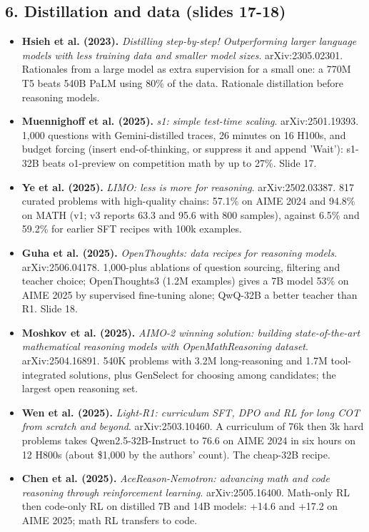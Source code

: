 \subsection*{6. Distillation and data (slides 17-18)}
\begin{itemize}[leftmargin=1.2em,itemsep=3pt]\sloppy
\item \textbf{Hsieh et al. (2023).} \textit{Distilling step-by-step! Outperforming larger language models with less training data and smaller model sizes}. arXiv:2305.02301. Rationales from a large model as extra supervision for a small one: a 770M T5 beats 540B PaLM using 80\% of the data. Rationale distillation before reasoning models.
\item \textbf{Muennighoff et al. (2025).} \textit{s1: simple test-time scaling}. arXiv:2501.19393. 1,000 questions with Gemini-distilled traces, 26 minutes on 16 H100s, and budget forcing (insert end-of-thinking, or suppress it and append 'Wait'): s1-32B beats o1-preview on competition math by up to 27\%. Slide 17.
\item \textbf{Ye et al. (2025).} \textit{LIMO: less is more for reasoning}. arXiv:2502.03387. 817 curated problems with high-quality chains: 57.1\% on AIME 2024 and 94.8\% on MATH (v1; v3 reports 63.3 and 95.6 with 800 samples), against 6.5\% and 59.2\% for earlier SFT recipes with 100k examples.
\item \textbf{Guha et al. (2025).} \textit{OpenThoughts: data recipes for reasoning models}. arXiv:2506.04178. 1,000-plus ablations of question sourcing, filtering and teacher choice; OpenThoughts3 (1.2M examples) gives a 7B model 53\% on AIME 2025 by supervised fine-tuning alone; QwQ-32B a better teacher than R1. Slide 18.
\item \textbf{Moshkov et al. (2025).} \textit{AIMO-2 winning solution: building state-of-the-art mathematical reasoning models with OpenMathReasoning dataset}. arXiv:2504.16891. 540K problems with 3.2M long-reasoning and 1.7M tool-integrated solutions, plus GenSelect for choosing among candidates; the largest open reasoning set.
\item \textbf{Wen et al. (2025).} \textit{Light-R1: curriculum SFT, DPO and RL for long COT from scratch and beyond}. arXiv:2503.10460. A curriculum of 76k then 3k hard problems takes Qwen2.5-32B-Instruct to 76.6 on AIME 2024 in six hours on 12 H800s (about \$1,000 by the authors' count). The cheap-32B recipe.
\item \textbf{Chen et al. (2025).} \textit{AceReason-Nemotron: advancing math and code reasoning through reinforcement learning}. arXiv:2505.16400. Math-only RL then code-only RL on distilled 7B and 14B models: +14.6 and +17.2 on AIME 2025; math RL transfers to code.

\end{itemize}
